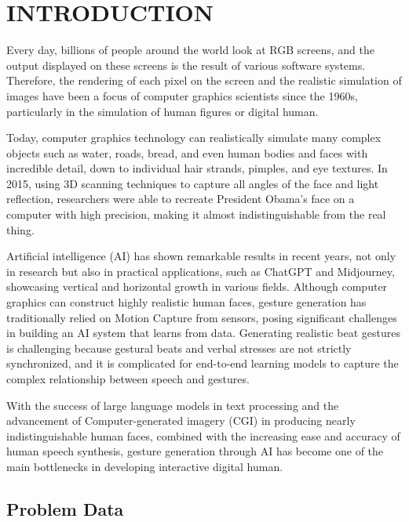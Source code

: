\section{INTRODUCTION}
\label{sec:introduction}

Every day, billions of people around the world look at RGB screens, and the output displayed on these screens is the result of various software systems. Therefore, the rendering of each pixel on the screen and the realistic simulation of images have been a focus of computer graphics scientists since the 1960s, particularly in the simulation of human figures or digital human.

Today, computer graphics technology can realistically simulate many complex objects such as water, roads, bread, and even human bodies and faces with incredible detail, down to individual hair strands, pimples, and eye textures. In 2015, using 3D scanning techniques \cite{metallo2015scanning} to capture all angles of the face and light reflection, researchers were able to recreate President Obama's face on a computer with high precision, making it almost indistinguishable from the real thing.

Artificial intelligence (AI) has shown remarkable results in recent years, not only in research but also in practical applications, such as ChatGPT and Midjourney, showcasing vertical and horizontal growth in various fields. Although computer graphics can construct highly realistic human faces, gesture generation has traditionally relied on Motion Capture from sensors, posing significant challenges in building an AI system that learns from data. Generating realistic beat gestures is challenging because gestural beats and verbal stresses are not strictly synchronized, and it is complicated for end-to-end learning models to capture the complex relationship between speech and gestures.


With the success of large language models in text processing and the advancement of Computer-generated imagery (CGI) in producing nearly indistinguishable human faces, combined with the increasing ease and accuracy of human speech synthesis, gesture generation through AI has become one of the main bottlenecks in developing interactive digital human.


\subsection{Problem Data}
\label{sec:Data}


